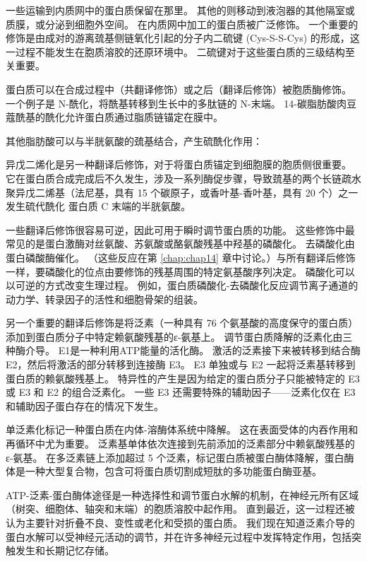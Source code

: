 一些运输到内质网中的蛋白质保留在那里。 
其他的则移动到液泡器的其他隔室或质膜，或分泌到细胞外空间。 
在内质网中加工的蛋白质被广泛修饰。 
一个重要的修饰是由成对的游离巯基侧链氧化引起的分子内二硫键 (Cys-S-S-Cys) 的形成，这一过程不能发生在胞质溶胶的还原环境中。 
二硫键对于这些蛋白质的三级结构至关重要。


蛋白质可以在合成过程中（共翻译修饰）或之后（翻译后修饰）被胞质酶修饰。 
一个例子是 N-酰化，将酰基转移到生长中的多肽链的 N-末端。 
14-碳脂肪酸肉豆蔻酰基的酰化允许蛋白质通过脂质链锚定在膜中。


其他脂肪酸可以与半胱氨酸的巯基结合，产生硫酰化作用：

异戊二烯化是另一种翻译后修饰，对于将蛋白质锚定到细胞膜的胞质侧很重要。 
它在蛋白质合成完成后不久发生，涉及一系列酶促步骤，导致巯基的两个长链疏水聚异戊二烯基（法尼基，具有 15 个碳原子，或香叶基-香叶基，具有 20 个）之一发生硫代酰化 蛋白质 C 末端的半胱氨酸。


一些翻译后修饰很容易可逆，因此可用于瞬时调节蛋白质的功能。 
这些修饰中最常见的是蛋白激酶对丝氨酸、苏氨酸或酪氨酸残基中羟基的磷酸化。 
去磷酸化由蛋白磷酸酶催化。 （这些反应在第 \ref{chap:chap14} 章中讨论。）与所有翻译后修饰一样，要磷酸化的位点由要修饰的残基周围的特定氨基酸序列决定。 
磷酸化可以以可逆的方式改变生理过程。 
例如，蛋白质磷酸化-去磷酸化反应调节离子通道的动力学、转录因子的活性和细胞骨架的组装。


另一个重要的翻译后修饰是将泛素（一种具有 76 个氨基酸的高度保守的蛋白质）添加到蛋白质分子中特定赖氨酸残基的ε-氨基上。 
调节蛋白质降解的泛素化由三种酶介导。 
E1是一种利用ATP能量的活化酶。 
激活的泛素接下来被转移到结合酶 E2，然后将激活的部分转移到连接酶 E3。 
E3 单独或与 E2 一起将泛素基转移到蛋白质的赖氨酸残基上。 
特异性的产生是因为给定的蛋白质分子只能被特定的 E3 或 E3 和 E2 的组合泛素化。 
一些 E3 还需要特殊的辅助因子——泛素化仅在 E3 和辅助因子蛋白存在的情况下发生。


单泛素化标记一种蛋白质在内体-溶酶体系统中降解。 
这在表面受体的内吞作用和再循环中尤为重要。 
泛素基单体依次连接到先前添加的泛素部分中赖氨酸残基的ε-氨基。 
在多泛素链上添加超过 5 个泛素，标记蛋白质被蛋白酶体降解，蛋白酶体是一种大型复合物，包含可将蛋白质切割成短肽的多功能蛋白酶亚基。


ATP-泛素-蛋白酶体途径是一种选择性和调节蛋白水解的机制，在神经元所有区域（树突、细胞体、轴突和末端）的胞质溶胶中起作用。 
直到最近，这一过程还被认为主要针对折叠不良、变性或老化和受损的蛋白质。 
我们现在知道泛素介导的蛋白水解可以受神经元活动的调节，并在许多神经元过程中发挥特定作用，包括突触发生和长期记忆存储。


